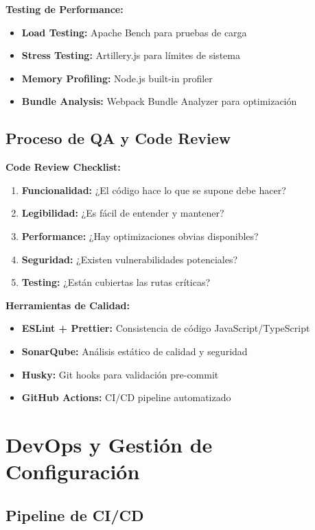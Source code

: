 \documentclass[12pt,a4paper]{report}
\begin{document}
\textbf{Testing de Performance:}
\begin{itemize}
\item \textbf{Load Testing:} Apache Bench para pruebas de carga
\item \textbf{Stress Testing:} Artillery.js para límites de sistema
\item \textbf{Memory Profiling:} Node.js built-in profiler
\item \textbf{Bundle Analysis:} Webpack Bundle Analyzer para optimización
\end{itemize}

\subsection{Proceso de QA y Code Review}

\textbf{Code Review Checklist:}
\begin{enumerate}
\item \textbf{Funcionalidad:} ¿El código hace lo que se supone debe hacer?
\item \textbf{Legibilidad:} ¿Es fácil de entender y mantener?
\item \textbf{Performance:} ¿Hay optimizaciones obvias disponibles?
\item \textbf{Seguridad:} ¿Existen vulnerabilidades potenciales?
\item \textbf{Testing:} ¿Están cubiertas las rutas críticas?
\end{enumerate}

\textbf{Herramientas de Calidad:}
\begin{itemize}
\item \textbf{ESLint + Prettier:} Consistencia de código JavaScript/TypeScript
\item \textbf{SonarQube:} Análisis estático de calidad y seguridad
\item \textbf{Husky:} Git hooks para validación pre-commit
\item \textbf{GitHub Actions:} CI/CD pipeline automatizado
\end{itemize}

\section{DevOps y Gestión de Configuración}

\subsection{Pipeline de CI/CD}
\end{document}
